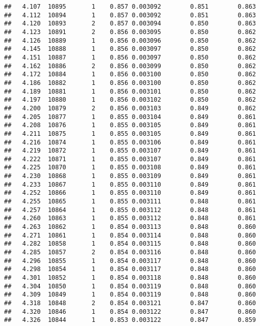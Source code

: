 \documentclass[
]{book}
\begin{document}
\begin{verbatim}
##   4.107  10895       1    0.857 0.003092        0.851        0.863
##   4.112  10894       1    0.857 0.003092        0.851        0.863
##   4.120  10893       2    0.857 0.003094        0.850        0.863
##   4.123  10891       2    0.856 0.003095        0.850        0.862
##   4.126  10889       1    0.856 0.003096        0.850        0.862
##   4.145  10888       1    0.856 0.003097        0.850        0.862
##   4.151  10887       1    0.856 0.003097        0.850        0.862
##   4.162  10886       2    0.856 0.003099        0.850        0.862
##   4.172  10884       1    0.856 0.003100        0.850        0.862
##   4.186  10882       1    0.856 0.003100        0.850        0.862
##   4.189  10881       1    0.856 0.003101        0.850        0.862
##   4.197  10880       1    0.856 0.003102        0.850        0.862
##   4.200  10879       2    0.856 0.003103        0.849        0.862
##   4.205  10877       1    0.855 0.003104        0.849        0.861
##   4.208  10876       1    0.855 0.003105        0.849        0.861
##   4.211  10875       1    0.855 0.003105        0.849        0.861
##   4.216  10874       1    0.855 0.003106        0.849        0.861
##   4.219  10872       1    0.855 0.003107        0.849        0.861
##   4.222  10871       1    0.855 0.003107        0.849        0.861
##   4.225  10870       1    0.855 0.003108        0.849        0.861
##   4.230  10868       1    0.855 0.003109        0.849        0.861
##   4.233  10867       1    0.855 0.003110        0.849        0.861
##   4.252  10866       1    0.855 0.003110        0.849        0.861
##   4.255  10865       1    0.855 0.003111        0.848        0.861
##   4.257  10864       1    0.855 0.003112        0.848        0.861
##   4.260  10863       1    0.855 0.003112        0.848        0.861
##   4.263  10862       1    0.854 0.003113        0.848        0.860
##   4.271  10861       1    0.854 0.003114        0.848        0.860
##   4.282  10858       1    0.854 0.003115        0.848        0.860
##   4.285  10857       2    0.854 0.003116        0.848        0.860
##   4.296  10855       1    0.854 0.003117        0.848        0.860
##   4.298  10854       1    0.854 0.003117        0.848        0.860
##   4.301  10852       1    0.854 0.003118        0.848        0.860
##   4.304  10850       1    0.854 0.003119        0.848        0.860
##   4.309  10849       1    0.854 0.003119        0.848        0.860
##   4.318  10848       2    0.854 0.003121        0.847        0.860
##   4.320  10846       1    0.854 0.003122        0.847        0.860
##   4.326  10844       1    0.853 0.003122        0.847        0.859

\end{verbatim}
\end{document}
